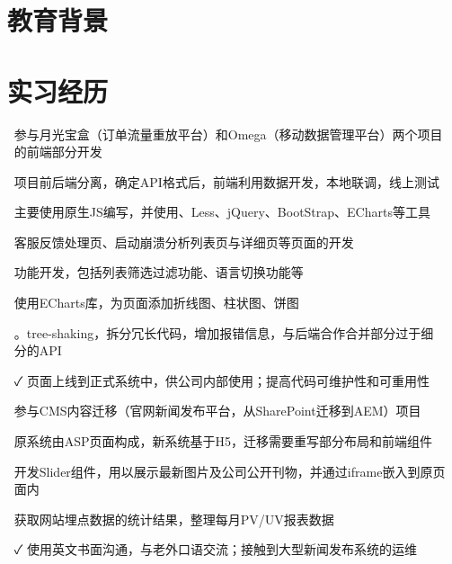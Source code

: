 \documentclass[14pt]{resume}
\begin{document}
\section{\faGraduationCap\  教育背景}

\section{\faBriefcase\ 实习经历}
\begin{itemize}
    \item[\faFlagO] 参与月光宝盒（订单流量重放平台）和Omega（移动数据管理平台）两个项目的前端部分开发
    \item[\faFlagO] 项目前后端分离，确定API格式后，前端利用\textbf{\color{red}{Mock}}数据开发，本地联调，线上测试
    \item[\faFlagO] 主要使用原生JS编写，并使用\textbf{\color{red}{模板引擎Simplite}}、Less、jQuery、BootStrap、ECharts等工具
    \item[\faCode] 客服反馈处理页、启动崩溃分析列表页与详细页等页面的开发
    \item[\faCode] 功能开发，包括列表筛选过滤功能、语言切换功能等
    \item[\faCode] 使用ECharts库，为页面添加折线图、柱状图、饼图
    \item[\faCode] \textbf{\color{red}{代码重构}}。tree-shaking，拆分冗长代码，增加报错信息，与后端合作合并部分过于细分的API
    \item[\faCheck] 页面上线到正式系统中，供公司内部使用；提高代码可维护性和可重用性
\end{itemize}


\begin{itemize}
    \item[\faFlagO] 参与CMS内容迁移（官网新闻发布平台，从SharePoint迁移到AEM）项目
    \item[\faFlagO] 原系统由ASP页面构成，新系统基于H5，迁移需要重写部分布局和前端组件
    \item[\faCode] 开发Slider组件，用以展示最新图片及公司公开刊物，并通过iframe嵌入到原页面内
    \item[\faCode] 获取网站埋点数据的统计结果，整理每月PV/UV报表数据
    \item[\faCheck] 使用英文书面沟通，与老外口语交流；接触到大型新闻发布系统的运维
\end{itemize}
\end{document}
